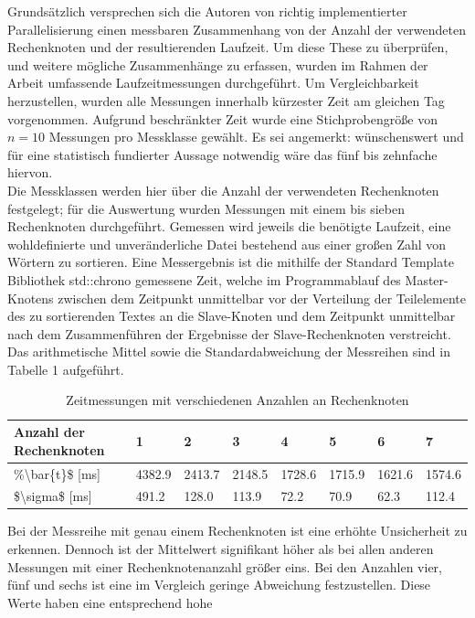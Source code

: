 Grundsätzlich versprechen sich die Autoren von richtig implementierter Parallelisierung einen messbaren Zusammenhang von der Anzahl der verwendeten Rechenknoten und der resultierenden Laufzeit.
Um diese These zu überprüfen, und weitere mögliche Zusammenhänge zu erfassen, wurden im Rahmen der Arbeit umfassende Laufzeitmessungen durchgeführt.
Um Vergleichbarkeit herzustellen, wurden alle Messungen innerhalb kürzester Zeit am gleichen Tag vorgenommen. Aufgrund beschränkter Zeit wurde eine Stichprobengröße von $n = 10$ Messungen pro Messklasse gewählt.
Es sei angemerkt: wünschenswert und für eine statistisch fundierter Aussage notwendig wäre das fünf bis zehnfache hiervon. \\
Die Messklassen werden hier über die Anzahl der verwendeten Rechenknoten festgelegt; für die Auswertung wurden Messungen mit einem bis sieben Rechenknoten durchgeführt.
Gemessen wird jeweils die benötigte Laufzeit, eine wohldefinierte und unveränderliche Datei bestehend aus einer großen Zahl von Wörtern zu sortieren.
Eine Messergebnis ist die mithilfe der Standard Template Bibliothek std::chrono gemessene Zeit, welche im Programmablauf des Master-Knotens zwischen dem Zeitpunkt unmittelbar vor der Verteilung der Teilelemente 
des zu sortierenden Textes an die Slave-Knoten und dem Zeitpunkt unmittelbar nach dem Zusammenführen der Ergebnisse der Slave-Rechenknoten verstreicht.
Das arithmetische Mittel sowie die Standardabweichung der Messreihen sind in Tabelle 1 aufgeführt.
\begin{table}
    \centering
    \caption{Zeitmessungen mit verschiedenen Anzahlen an Rechenknoten}
    \label{zeiten_tabelle}
    \begin{tabular}{l|lllllll}
    \textbf{Anzahl der Rechenknoten}  & \textbf{1} & \textbf{2} & \textbf{3} & \textbf{4} & \textbf{5} & \textbf{6} & \textbf{7}  \\ 
    \hline\hline
    \%\textbackslash{}bar\{t\}\$ [ms] & 4382.9     & 2413.7     & 2148.5     & 1728.6     & 1715.9     & 1621.6     & 1574.6      \\
    \$\textbackslash{}sigma\$ [ms]    & 491.2      & 128.0      & 113.9      & 72.2       & 70.9       & 62.3       & 112.4      
    \end{tabular}
\end{table}
Bei der Messreihe mit genau einem Rechenknoten ist eine erhöhte Unsicherheit zu erkennen. Dennoch ist der Mittelwert signifikant höher als bei allen anderen 
Messungen mit einer Rechenknotenanzahl größer eins. Bei den Anzahlen vier, fünf und sechs ist eine im Vergleich geringe Abweichung festzustellen. Diese Werte haben eine entsprechend hohe 
